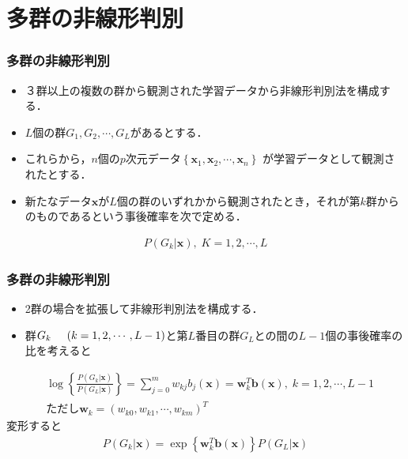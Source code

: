 \documentclass[dvipdfmx,cjk]{beamer}
\theoremstyle{example}
\begin{document}
\section{多群の非線形判別}
\begin{frame}
    \frametitle{多群の非線形判別}
    \begin{itemize}
        \item ３群以上の複数の群から観測された学習データから非線形判別法を構成する．
        \item $L$個の群$G_1,G_2,\cdots , G_L$があるとする．
        \item これらから，$n$個の$p$次元データ$\left\{\boldsymbol{x}_1,\boldsymbol{x}_2,\cdots,\boldsymbol{x}_n\right\}$
              が学習データとして観測されたとする．
        \item 新たなデータ$\boldsymbol{x}$が$L$個の群のいずれかから観測されたとき，それが第$k$群からのものであるという事後確率を次で定める．
    \end{itemize}
    \begin{align*}
        P(G_k|\boldsymbol{x}), \; K=1,2,\cdots ,L
    \end{align*}

\end{frame}
\begin{frame}
    \frametitle{多群の非線形判別}
    \begin{itemize}
        \item 2群の場合を拡張して非線形判別法を構成する．
        \item 群$G_k \hspace{5mm} (k=1,2,\cdots ,L-1)$と第$L$番目の群$G_L$との間の$L-1$個の事後確率の比を考えると
    \end{itemize}
    \begin{align*}
         & \log \left\{\frac{P(G_k|\boldsymbol{x})}{P(G_L|\boldsymbol{x})}\right\} =\sum_{j=0}^{m} w_{kj}b_j(\boldsymbol{x})=\boldsymbol{w}_k^T\boldsymbol{b}(\boldsymbol{x}), \; k=1,2,\cdots , L-1 \\
         & \text{ただし}\boldsymbol{w}_k=(w_{k0},w_{k1},\cdots ,w_{km})^T
    \end{align*}
    変形すると
    \begin{align*}
        P(G_k|\boldsymbol{x})=\exp\left\{\boldsymbol{w}_k^T\boldsymbol{b}(\boldsymbol{x})\right\}P(G_L|\boldsymbol{x}) \tag{A}
    \end{align*}
\end{frame}
\end{document}
